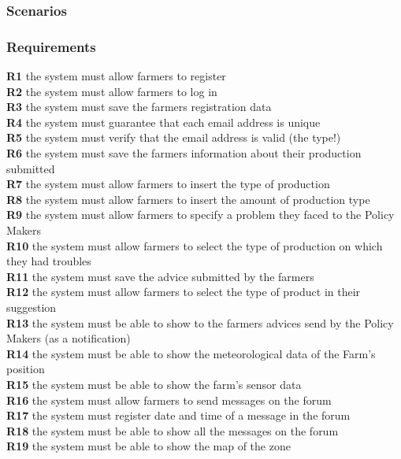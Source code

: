 \subsubsection{Scenarios}
\subsubsection{Requirements}
\textbf{R1} the system must allow farmers to register\\
\textbf{R2} the system must allow farmers to log in\\
\textbf{R3} the system must save the farmers registration data\\
\textbf{R4} the system must guarantee that each email address is unique\\
\textbf{R5} the system must verify that the email address is valid (the type!)\\
\textbf{R6} the system must save the farmers information about their production submitted\\
\textbf{R7} the system must allow farmers to insert the type of production \\
\textbf{R8} the system must allow farmers to insert the amount of production type\\
\textbf{R9} the system must allow farmers to specify a problem they faced to the Policy Makers\\
\textbf{R10} the system must allow farmers to select the type of production on which they had troubles\\
\textbf{R11} the system must save the advice submitted by the farmers\\
\textbf{R12} the system must allow farmers to select the type of product in their suggestion\\
\textbf{R13} the system must be able to show to the farmers advices send by the Policy Makers (as a notification)\\
\textbf{R14} the system must be able to show the meteorological data of the Farm’s position\\
\textbf{R15} the system must be able to show the farm’s sensor data \\
\textbf{R16} the system must allow farmers to send messages on the forum\\
\textbf{R17} the system must register date and time of a message in the forum\\
\textbf{R18} the system must be able to show all the messages on the forum\\
\textbf{R19} the system must be able to show the map of the zone\\

